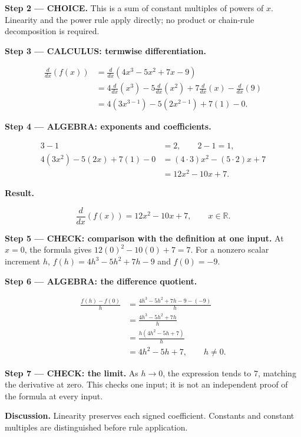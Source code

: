 \documentclass[11pt,oneside,openany]{book}
\begin{document}
\begin{ChoiceStep}
\textbf{Step 2 --- CHOICE.} This is a sum of constant multiples of powers of \(x\).
Linearity and the power rule apply directly; no product or chain-rule decomposition is required.

\end{ChoiceStep}
\textbf{Step 3 --- CALCULUS: termwise differentiation.}

\[
\begin{aligned}
\frac{d}{dx}\left(f(x)\right)
&=\frac{d}{dx}\left(4x^3-5x^2+7x-9\right)\\
&=4\frac{d}{dx}\left(x^3\right)
-5\frac{d}{dx}\left(x^2\right)
+7\frac{d}{dx}\left(x\right)
-\frac{d}{dx}\left(9\right)\\
&=4(3x^{3-1})-5(2x^{2-1})+7(1)-0.
\end{aligned}
\]

\begingroup\color{AlgebraBlue}
\textbf{Step 4 --- ALGEBRA: exponents and coefficients.}

\[
\begin{aligned}
3-1&=2,\qquad 2-1=1,\\
4(3x^2)-5(2x)+7(1)-0
&=(4\cdot3)x^2-(5\cdot2)x+7\\
&=12x^2-10x+7.
\end{aligned}
\]

\endgroup
\textbf{Result.}

\[
\boxed{\frac{d}{dx}\left(f(x)\right)=12x^2-10x+7,
\qquad x\in\mathbb R.}
\]

\textbf{Step 5 --- CHECK: comparison with the definition at one input.} At \(x=0\), the
formula gives \(12(0)^2-10(0)+7=7\). For a nonzero scalar increment \(h\),
\(f(h)=4h^3-5h^2+7h-9\) and \(f(0)=-9\).

\begingroup\color{AlgebraBlue}
\textbf{Step 6 --- ALGEBRA: the difference quotient.}

\[
\begin{aligned}
\frac{f(h)-f(0)}{h}
&=\frac{4h^3-5h^2+7h-9-(-9)}{h}\\
&=\frac{4h^3-5h^2+7h}{h}\\
&=\frac{h(4h^2-5h+7)}{h}\\
&=4h^2-5h+7,\qquad h\ne0.
\end{aligned}
\]

\endgroup
\textbf{Step 7 --- CHECK: the limit.} As \(h\to0\), the expression tends to \(7\),
matching the derivative at zero. This checks one input; it is not an independent
proof of the formula at every input.

\textbf{Discussion.} Linearity preserves each signed coefficient.
Constants and constant multiples are distinguished before rule application.
\clearpage
\end{document}
